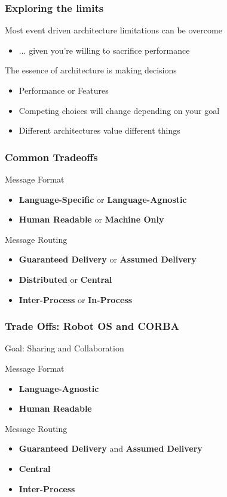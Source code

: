 \documentclass{beamer}
\begin{document}
	\begin{frame}
		\frametitle {Exploring the limits}

		Most event driven architecture limitations can be overcome
		\begin{itemize}
			\item ... given you're willing to sacrifice performance
		\end{itemize}

		The essence of architecture is making decisions
		\begin{itemize}
			\item Performance or Features
			\item Competing choices will change depending on your goal
			\item Different architectures value different things
		\end{itemize}
	\end{frame}

	\begin{frame}
		\frametitle{Common Tradeoffs}

		Message Format
		\begin{itemize}
			\item \textbf{Language-Specific} or \textbf{Language-Agnostic}
			\item \textbf{Human Readable} or \textbf{Machine Only}
		\end{itemize}

		Message Routing
		\begin{itemize}
			\item \textbf{Guaranteed Delivery} or \textbf{Assumed Delivery}
			\item \textbf{Distributed} or \textbf{Central}
			\item \textbf{Inter-Process} or \textbf{In-Process}
		\end{itemize}
	\end{frame}

	\begin{frame}
		\frametitle{Trade Offs: Robot OS and CORBA}
		Goal: Sharing and Collaboration

		Message Format
		\begin{itemize}
			\item \textbf{Language-Agnostic}
			\item \textbf{Human Readable}
		\end{itemize}

		Message Routing
		\begin{itemize}
			\item \textbf{Guaranteed Delivery} and \textbf{Assumed Delivery}
			\item \textbf{Central}
			\item \textbf{Inter-Process}
		\end{itemize}
	\end{frame}
\end{document}
